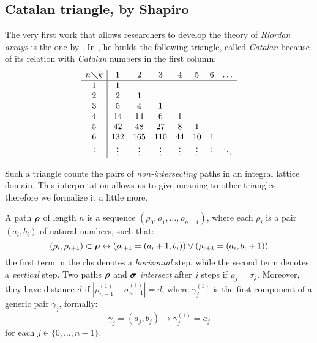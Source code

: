
\subsection{Catalan triangle, by Shapiro}

The very first work that allows researchers to develop the theory of
\emph{Riordan arrays} is the one by \citeauthor{shapiro:1976}. 
In \cite{shapiro:1976}, he builds the following triangle, called
\emph{Catalan} because of its relation with \emph{Catalan} numbers in the first
column:
\begin{equation}
    \begin{array}{c|ccccccc}
        n\diagdown k & 1 & 2 & 3 & 4 & 5 & 6&\ldots\\
        \hline
        1&1 & & & & & &\\
        2&2 &1 & & & & &\\
        3&5 &4 &1 & & & &\\
        4&14 &14 &6 &1 & & &\\
        5&42 &48 &27 &8 &1 & &\\
        6&132 &165 &110 &44 &10 &1& \\
        \vdots&\vdots&\vdots&\vdots&\vdots&\vdots&\vdots&\ddots \\
    \end{array}
    \label{eq:shapiro:catalan:triangle:expanded}
\end{equation}

Such a triangle counts the pairs of \emph{non-intersecting} paths  in an
integral lattice domain. This interpretation allows us to give meaning to other
triangles, therefore we formalize it a little more.

A path $\boldsymbol{\rho}$ of length $n$ is a sequence $(\rho_{0},\rho_{1},\ldots,\rho_{n-1})$,
where each $\rho_{i}$ is a pair $(a_{i},b_{i})$ of natural numbers, such that:
\begin{displaymath}
    (\rho_{i},\rho_{i+1})\subset\boldsymbol{\rho} \leftrightarrow
    (\rho_{i+1}=(a_{i}+1,b_{i})) \vee 
    (\rho_{i+1}=(a_{i},b_{i}+1)) 
\end{displaymath}
the first term in the \ac{rhs} denotes a \emph{horizontal} step, while the second
term denotes a \emph{vertical} step. Two paths $\boldsymbol{\rho}$ and
$\boldsymbol{\sigma}$ \emph{intersect} after $j$ steps if $\rho_{j}=\sigma_{j}$.
Moreover, they have distance $d$ if
$\left|\rho_{n-1}^{(1)}-\sigma_{n-1}^{(1)}\right|=d$, where $\gamma_{j}^{(1)}$
is the first component of a generic pair $\gamma_{j}$, formally:
\begin{displaymath}
    \gamma_{j}=(a_{j},b_{j}) \rightarrow \gamma_{j}^{(1)}=a_{j}
\end{displaymath}
for each $j\in\lbrace0,\ldots,n-1\rbrace$.

